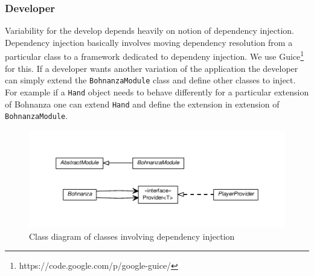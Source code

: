 \subsubsection{Developer}
Variability for the develop depends heavily on notion of dependency injection. Dependency injection
basically involves moving dependency resolution from a particular class to a framework dedicated to
dependeny injection. We use Guice\footnote{https://code.google.com/p/google-guice/} for this. If a
developer wants another variation of the application the developer can simply extend the
\texttt{BohnanzaModule} class and define other classes to inject. For example if a \texttt{Hand}
object needs to behave differently for a particular extension of Bohnanza one can extend
\texttt{Hand} and define the extension in extension of \texttt{BohnanzaModule}.

\begin{figure}[h!]
    \includegraphics[width=\textwidth]{../umlgraph/ModuleGraph}
    \caption{Class diagram of classes involving dependency injection}
    \label{fig:design:cards}
\end{figure}
